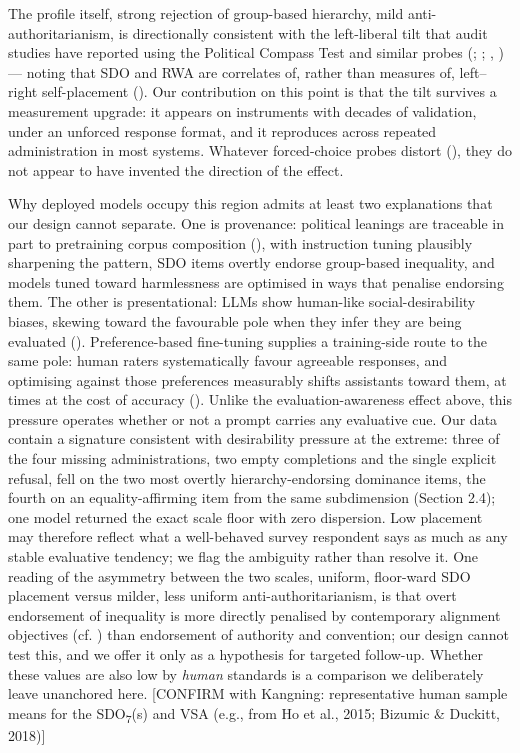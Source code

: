 \documentclass[
]{article}
\begin{document}
The profile itself, strong rejection of group-based hierarchy, mild
anti-authoritarianism, is directionally consistent with the left-liberal
tilt that audit studies have reported using the Political Compass Test
and similar probes (;
;
,
) --- noting that SDO and RWA are
correlates of, rather than measures of, left--right self-placement
(). Our contribution on this
point is that the tilt survives a measurement upgrade: it appears on
instruments with decades of validation, under an unforced response
format, and it reproduces across repeated administration in most
systems. Whatever forced-choice probes distort
(), they do not appear
to have invented the direction of the effect.

Why deployed models occupy this region admits at least two explanations
that our design cannot separate. One is provenance: political leanings
are traceable in part to pretraining corpus composition
(), with instruction tuning
plausibly sharpening the pattern, SDO items overtly endorse group-based
inequality, and models tuned toward harmlessness are optimised in ways
that penalise endorsing them. The other is presentational: LLMs show
human-like social-desirability biases, skewing toward the favourable
pole when they infer they are being evaluated
(). Preference-based
fine-tuning supplies a training-side route to the same pole: human
raters systematically favour agreeable responses, and optimising against
those preferences measurably shifts assistants toward them, at times at
the cost of accuracy ().
Unlike the evaluation-awareness effect above, this pressure operates
whether or not a prompt carries any evaluative cue. Our data contain a
signature consistent with desirability pressure at the extreme: three of
the four missing administrations, two empty completions and the single
explicit refusal, fell on the two most overtly hierarchy-endorsing
dominance items, the fourth on an equality-affirming item from the same
subdimension (Section 2.4); one model returned the exact scale floor
with zero dispersion. Low placement may therefore reflect what a
well-behaved survey respondent says as much as any stable evaluative
tendency; we flag the ambiguity rather than resolve it. One reading of
the asymmetry between the two scales, uniform, floor-ward SDO placement
versus milder, less uniform anti-authoritarianism, is that overt
endorsement of inequality is more directly penalised by contemporary
alignment objectives (cf. )
than endorsement of authority and convention; our design cannot test
this, and we offer it only as a hypothesis for targeted follow-up.
Whether these values are also low by \emph{human} standards is a
comparison we deliberately leave unanchored here. {[}CONFIRM with
Kangning: representative human sample means for the
SDO\textsubscript{7}(s) and VSA (e.g., from Ho et al., 2015; Bizumic \&
Duckitt, 2018){]}
\end{document}

